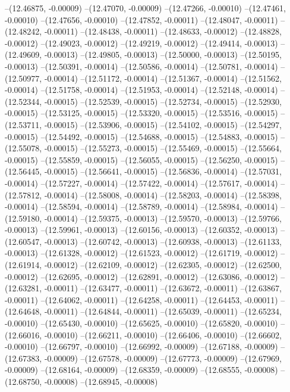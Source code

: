 --(12.46875, -0.00009)
--(12.47070, -0.00009)
--(12.47266, -0.00010)
--(12.47461, -0.00010)
--(12.47656, -0.00010)
--(12.47852, -0.00011)
--(12.48047, -0.00011)
--(12.48242, -0.00011)
--(12.48438, -0.00011)
--(12.48633, -0.00012)
--(12.48828, -0.00012)
--(12.49023, -0.00012)
--(12.49219, -0.00012)
--(12.49414, -0.00013)
--(12.49609, -0.00013)
--(12.49805, -0.00013)
--(12.50000, -0.00013)
--(12.50195, -0.00013)
--(12.50391, -0.00014)
--(12.50586, -0.00014)
--(12.50781, -0.00014)
--(12.50977, -0.00014)
--(12.51172, -0.00014)
--(12.51367, -0.00014)
--(12.51562, -0.00014)
--(12.51758, -0.00014)
--(12.51953, -0.00014)
--(12.52148, -0.00014)
--(12.52344, -0.00015)
--(12.52539, -0.00015)
--(12.52734, -0.00015)
--(12.52930, -0.00015)
--(12.53125, -0.00015)
--(12.53320, -0.00015)
--(12.53516, -0.00015)
--(12.53711, -0.00015)
--(12.53906, -0.00015)
--(12.54102, -0.00015)
--(12.54297, -0.00015)
--(12.54492, -0.00015)
--(12.54688, -0.00015)
--(12.54883, -0.00015)
--(12.55078, -0.00015)
--(12.55273, -0.00015)
--(12.55469, -0.00015)
--(12.55664, -0.00015)
--(12.55859, -0.00015)
--(12.56055, -0.00015)
--(12.56250, -0.00015)
--(12.56445, -0.00015)
--(12.56641, -0.00015)
--(12.56836, -0.00014)
--(12.57031, -0.00014)
--(12.57227, -0.00014)
--(12.57422, -0.00014)
--(12.57617, -0.00014)
--(12.57812, -0.00014)
--(12.58008, -0.00014)
--(12.58203, -0.00014)
--(12.58398, -0.00014)
--(12.58594, -0.00014)
--(12.58789, -0.00014)
--(12.58984, -0.00014)
--(12.59180, -0.00014)
--(12.59375, -0.00013)
--(12.59570, -0.00013)
--(12.59766, -0.00013)
--(12.59961, -0.00013)
--(12.60156, -0.00013)
--(12.60352, -0.00013)
--(12.60547, -0.00013)
--(12.60742, -0.00013)
--(12.60938, -0.00013)
--(12.61133, -0.00013)
--(12.61328, -0.00012)
--(12.61523, -0.00012)
--(12.61719, -0.00012)
--(12.61914, -0.00012)
--(12.62109, -0.00012)
--(12.62305, -0.00012)
--(12.62500, -0.00012)
--(12.62695, -0.00012)
--(12.62891, -0.00012)
--(12.63086, -0.00012)
--(12.63281, -0.00011)
--(12.63477, -0.00011)
--(12.63672, -0.00011)
--(12.63867, -0.00011)
--(12.64062, -0.00011)
--(12.64258, -0.00011)
--(12.64453, -0.00011)
--(12.64648, -0.00011)
--(12.64844, -0.00011)
--(12.65039, -0.00011)
--(12.65234, -0.00010)
--(12.65430, -0.00010)
--(12.65625, -0.00010)
--(12.65820, -0.00010)
--(12.66016, -0.00010)
--(12.66211, -0.00010)
--(12.66406, -0.00010)
--(12.66602, -0.00010)
--(12.66797, -0.00010)
--(12.66992, -0.00009)
--(12.67188, -0.00009)
--(12.67383, -0.00009)
--(12.67578, -0.00009)
--(12.67773, -0.00009)
--(12.67969, -0.00009)
--(12.68164, -0.00009)
--(12.68359, -0.00009)
--(12.68555, -0.00008)
--(12.68750, -0.00008)
--(12.68945, -0.00008)
